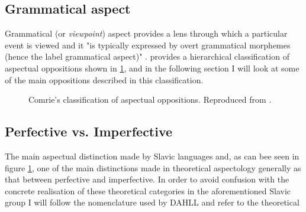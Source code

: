 \subsection*{\citet{moens-steedman-1988-temporal}}

\subsection{Grammatical aspect}
Grammatical (or \emph{viewpoint}) aspect provides a lens through which a particular event is viewed and it "is typically expressed by overt grammatical morphemes (hence the label grammatical aspect)" \citep{Chapter1IntroductionCrossLinguisticPerspectivesontheSemanticsofGrammaticalAspect}. \citet{comrie1976aspect} provides a hierarchical classification of aspectual oppositions shown in \ref{fig:comrieaspecttree}, and in the following section I will look at some of the main oppositions described in this classification.

\begin{figure}
    \centering
    \caption{Comrie's classification of aspectual oppositions. Reproduced from \citet{comrie1976aspect}.}
    \label{fig:comrieaspecttree}
\end{figure}

\subsection*{Perfective vs. Imperfective}
The main aspectual distinction made by Slavic languages and, as can bee seen in figure \ref{fig:comrieaspecttree}, one of the main distinctions made in theoretical aspectology generally as that between perfective and imperfective. In order to avoid confusion with the concrete realisation of these theoretical categories in the aforementioned Slavic group I will follow the nomenclature used by DAHLL and refer to the theoretical 
